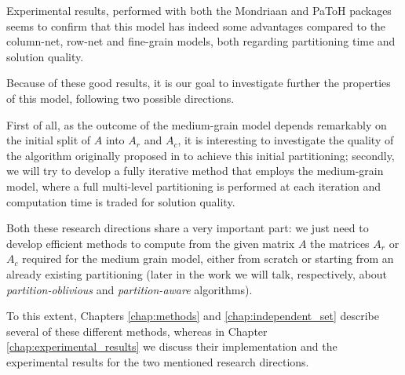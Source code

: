Experimental results, performed with both the Mondriaan and PaToH packages seems to confirm that this model has indeed some advantages compared to the column-net, row-net and fine-grain models, both regarding partitioning time and solution quality.

Because of these good results, it is our goal to investigate further the properties of this model, following two possible directions.

First of all, as the outcome of the medium-grain model depends remarkably on the initial split of $A$ into $A_r$ and $A_c$, it is interesting to investigate the quality of the algorithm originally proposed in \cite{mondriaan} to achieve this initial partitioning; secondly, we will try to develop a fully iterative method that employs the medium-grain model, where a full multi-level partitioning is performed at each iteration and computation time is traded for solution quality.

Both these research directions share a very important part: we just need to develop efficient methods to compute from the given matrix $A$ the matrices $A_r$ or $A_c$ required for the medium grain model, either from scratch or starting from an already existing partitioning (later in the work we will talk, respectively, about \emph{partition-oblivious} and \emph{partition-aware} algorithms). 

To this extent, Chapters \ref{chap:methods} and \ref{chap:independent_set} describe several of these different methods, whereas in Chapter \ref{chap:experimental_results} we discuss their implementation and the experimental results for the two mentioned research directions.
